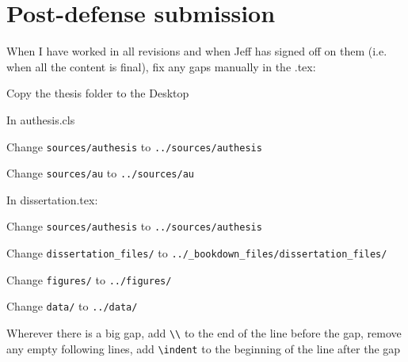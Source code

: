 \documentclass[12pt]{article}
\begin{document}
\section*{Post-defense submission}
	\begin{coi}
		\item When I have worked in all revisions and when Jeff has signed off on them (i.e. when all the content is final), fix any gaps manually in the .tex:
			\begin{coi}
				\item Copy the thesis folder to the Desktop
				\item In authesis.cls
					\begin{coi}
						\item Change \texttt{sources/authesis} to \texttt{../sources/authesis}
						\item Change \texttt{sources/au} to \texttt{../sources/au}
					\end{coi}
				\item In dissertation.tex:
					\begin{coi}
						\item Change \texttt{sources/authesis} to \texttt{../sources/authesis}
						\item Change \texttt{dissertation\_files/} to \texttt{../\_bookdown\_files/dissertation\_files/}
						\item Change \texttt{figures/} to \texttt{../figures/}
						\item Change \texttt{data/} to \texttt{../data/}
						\item Wherever there is a big gap, add \texttt{\textbackslash\textbackslash} to the end of the line before the gap, remove any empty following lines, add \texttt{\textbackslash indent} to the beginning of the line after the gap
					\end{coi}
			\end{coi}
	\end{coi}
\end{document}
